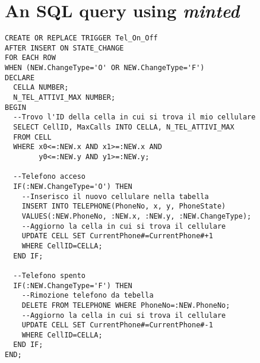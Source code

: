 \documentclass{article}
\begin{document}
\section*{An SQL query using \emph{minted}}

\begin{verbatim}
CREATE OR REPLACE TRIGGER Tel_On_Off
AFTER INSERT ON STATE_CHANGE
FOR EACH ROW
WHEN (NEW.ChangeType='O' OR NEW.ChangeType='F')
DECLARE
  CELLA NUMBER;
  N_TEL_ATTIVI_MAX NUMBER;
BEGIN
  --Trovo l'ID della cella in cui si trova il mio cellulare
  SELECT CellID, MaxCalls INTO CELLA, N_TEL_ATTIVI_MAX
  FROM CELL
  WHERE x0<=:NEW.x AND x1>=:NEW.x AND
        y0<=:NEW.y AND y1>=:NEW.y;
        
  --Telefono acceso
  IF(:NEW.ChangeType='O') THEN
    --Inserisco il nuovo cellulare nella tabella
    INSERT INTO TELEPHONE(PhoneNo, x, y, PhoneState)
    VALUES(:NEW.PhoneNo, :NEW.x, :NEW.y, :NEW.ChangeType);
    --Aggiorno la cella in cui si trova il cellulare
    UPDATE CELL SET CurrentPhone#=CurrentPhone#+1
    WHERE CellID=CELLA;
  END IF;
  
  --Telefono spento
  IF(:NEW.ChangeType='F') THEN
    --Rimozione telefono da tebella
    DELETE FROM TELEPHONE WHERE PhoneNo=:NEW.PhoneNo;
    --Aggiorno la cella in cui si trova il cellulare
    UPDATE CELL SET CurrentPhone#=CurrentPhone#-1
    WHERE CellID=CELLA;
  END IF; 
END;
\end{verbatim}
\end{document}
